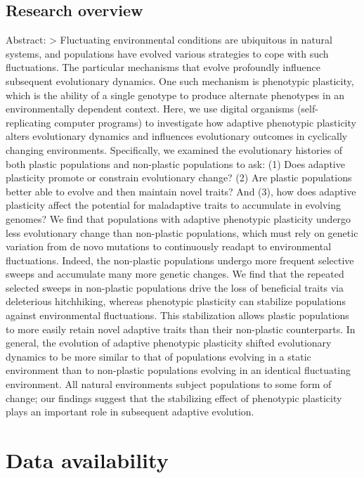\documentclass[]{book}
\begin{document}
\hypertarget{research-overview}{%
\section{Research overview}\label{research-overview}}

Abstract:
\textgreater{} Fluctuating environmental conditions are ubiquitous in natural systems, and populations have evolved various strategies to cope with such fluctuations.
The particular mechanisms that evolve profoundly influence subsequent evolutionary dynamics.
One such mechanism is phenotypic plasticity, which is the ability of a single genotype to produce alternate phenotypes in an environmentally dependent context.
Here, we use digital organisms (self-replicating computer programs) to investigate how adaptive phenotypic plasticity alters evolutionary dynamics and influences evolutionary outcomes in cyclically changing environments.
Specifically, we examined the evolutionary histories of both plastic populations and non-plastic populations to ask:
(1) Does adaptive plasticity promote or constrain evolutionary change?
(2) Are plastic populations better able to evolve and then maintain novel traits?
And (3), how does adaptive plasticity affect the potential for maladaptive traits to accumulate in evolving genomes?
We find that populations with adaptive phenotypic plasticity undergo less evolutionary change than non-plastic populations, which must rely on genetic variation from de novo mutations to continuously readapt to environmental fluctuations.
Indeed, the non-plastic populations undergo more frequent selective sweeps and accumulate many more genetic changes.
We find that the repeated selected sweeps in non-plastic populations drive the loss of beneficial traits via deleterious hitchhiking, whereas phenotypic plasticity can stabilize populations against environmental fluctuations.
This stabilization allows plastic populations to more easily retain novel adaptive traits than their non-plastic counterparts.
In general, the evolution of adaptive phenotypic plasticity shifted evolutionary dynamics to be more similar to that of populations evolving in a static environment than to non-plastic populations evolving in an identical fluctuating environment.
All natural environments subject populations to some form of change; our findings suggest that the stabilizing effect of phenotypic plasticity plays an important role in subsequent adaptive evolution.

\hypertarget{data-availability}{%
\chapter{Data availability}\label{data-availability}}
\end{document}
